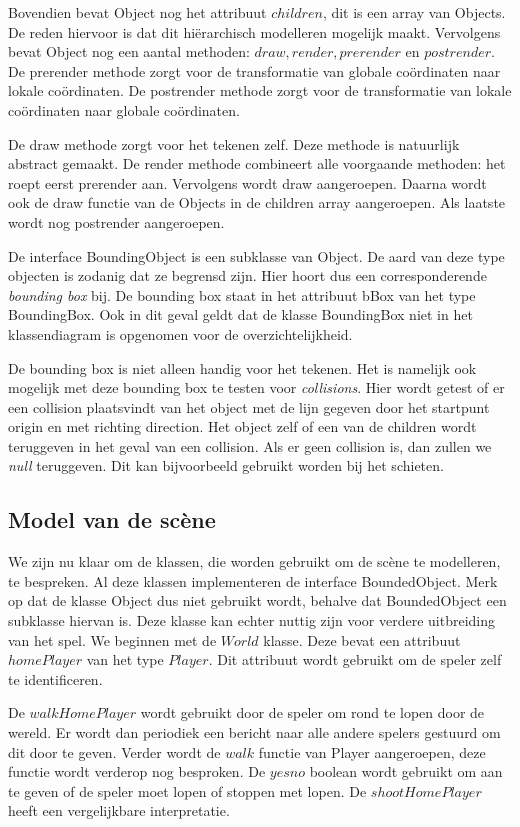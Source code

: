 \documentclass[a4paper,11pt, twoside]{article}
\begin{document}
Bovendien bevat Object nog het attribuut $children$, dit is een array van Objects. De reden hiervoor is dat dit hi\"erarchisch modelleren mogelijk maakt. Vervolgens bevat Object nog een aantal methoden: $draw, render, prerender$ en $postrender$. De prerender methode zorgt voor de transformatie van globale co\"ordinaten naar lokale co\"ordinaten. De postrender methode zorgt voor de transformatie van lokale co\"ordinaten naar globale co\"ordinaten.

De draw methode zorgt voor het tekenen zelf. Deze methode is natuurlijk abstract gemaakt. De render methode combineert alle voorgaande methoden: het roept eerst prerender aan. Vervolgens wordt draw aangeroepen. Daarna wordt ook de draw functie van de Objects in de children array aangeroepen. Als laatste wordt nog postrender aangeroepen.

De interface BoundingObject is een subklasse van Object. De aard van deze type objecten is zodanig dat ze begrensd zijn. Hier hoort dus een corresponderende \emph{bounding box} bij. De bounding box staat in het attribuut bBox van het type BoundingBox. Ook in dit geval geldt dat de klasse BoundingBox niet in het klassendiagram is opgenomen voor de overzichtelijkheid.

De bounding box is niet alleen handig voor het tekenen. Het is namelijk ook mogelijk met deze bounding box te testen voor \emph{collisions}. Hier wordt getest of er een collision plaatsvindt van het object met de lijn gegeven door het startpunt origin en met richting direction. Het object zelf of een van de children wordt teruggeven in het geval van een collision. Als er geen collision is, dan zullen we \emph{null} teruggeven. Dit kan bijvoorbeeld gebruikt worden bij het schieten.

\subsection{Model van de sc\`ene}
    \label{sec:model}
We zijn nu klaar om de klassen, die worden gebruikt om de sc\`ene te modelleren, te bespreken.  Al deze klassen implementeren de interface BoundedObject. Merk op dat de klasse Object dus niet gebruikt wordt, behalve dat BoundedObject een subklasse hiervan is. Deze klasse kan echter nuttig zijn voor verdere uitbreiding van het spel. We beginnen met de $World$ klasse. Deze bevat een attribuut $homePlayer$ van het type $Player$. Dit attribuut wordt gebruikt om de speler zelf te identificeren.

De $walkHomePlayer$ wordt gebruikt door de speler om rond te lopen door de wereld. Er wordt dan periodiek een bericht naar alle andere spelers gestuurd om dit door te geven. Verder wordt de $walk$ functie van Player aangeroepen, deze functie wordt verderop nog besproken. De $yesno$ boolean wordt gebruikt om aan te geven of de speler moet lopen of stoppen met lopen. De $shootHomePlayer$ heeft een vergelijkbare interpretatie.
\end{document}
